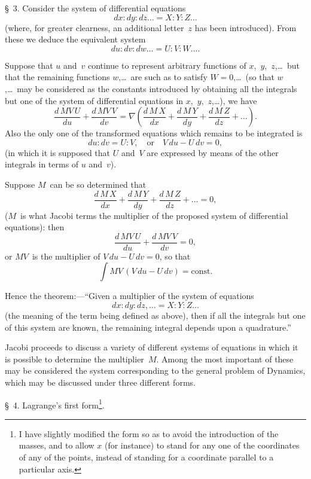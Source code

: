 \documentclass[11pt,a4paper]{article}
\newcommand{\papersection}[1]{\S\ #1.}
\begin{document}
\papersection{3} Consider the system of differential equations
\[
dx : dy : dz\ldots = X : Y : Z\ldots
\]
(where, for greater clearness, an additional letter~$z$ has been introduced). From these we deduce the equivalent system
\[
du : dv : dw\ldots = U : V : W\ldots.
\]

\newpage
Suppose that $u$ and~$v$ continue to represent arbitrary functions of $x$,~$y$,~$z$,\ldots\ but that the remaining functions $w$,\ldots\ are such as to satisfy $W=0$,\ldots\ (so that $w$,\ldots\ may be considered as the constants introduced by obtaining all the integrals but one of the system of differential equations in $x$,~$y$,~$z$,\ldots), we have
\[
\frac{d\,MV\,U}{du} + \frac{d\,MV\,V}{dv} = \nabla\left(\frac{d\,M\,X}{dx} + \frac{d\,M\,Y}{dy} + \frac{d\,M\,Z}{dz} + \ldots\right).
\]
Also the only one of the transformed equations which remains to be integrated is
\[
du : dv = U : V, \quad \text{or}\quad V\,du - U\,dv = 0,
\]
(in which it is supposed that $U$ and~$V$ are expressed by means of the other integrals in terms of $u$ and~$v$).

Suppose $M$~can be so determined that
\[
\frac{d\,M\,X}{dx} + \frac{d\,M\,Y}{dy} + \frac{d\,M\,Z}{dz} + \ldots = 0,
\]
($M$~is what Jacobi terms the multiplier of the proposed system of differential equations): then
\[
\frac{d\,MV\,U}{du} + \frac{d\,MV\,V}{dv} = 0,
\]
or $MV$~is the multiplier of $V\,du - U\,dv = 0$, so that
\[
\int MV\,(V\,du - U\,dv) = \text{const.}
\]

Hence the theorem:---``Given a multiplier of the system of equations
\[
dx : dy : dz,\ldots = X : Y : Z\ldots
\]
(the meaning of the term being defined as above), then if all the integrals but one of this system are known, the remaining integral depends upon a quadrature.''

Jacobi proceeds to discuss a variety of different systems of equations in which it is possible to determine the multiplier~$M$. Among the most important of these may be considered the system corresponding to the general problem of Dynamics, which may be discussed under three different forms.

\vspace{10pt}

\papersection{4} Lagrange's first form\footnote{I have slightly modified the form so as to avoid the introduction of the masses, and to allow $x$ (for instance) to stand for any one of the coordinates of any of the points, instead of standing for a coordinate parallel to a particular axis.}.
\end{document}
